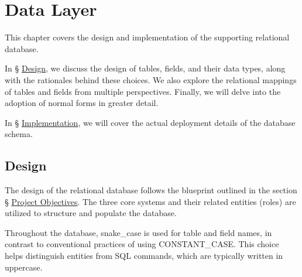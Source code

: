 \documentclass[12pt]{report}
\newcommand{\n}{\par}
\newcommand{\br}{\n\vspace{1 em}\n}
\begin{document}
\chapter{Data Layer} \label{data-layer}
This chapter covers the design and implementation of the supporting relational database.
\br
In \S{} \hyperref[data-layer.design]{Design},
we discuss the design of tables, fields, and their data types, along with the rationales behind these choices.
We also explore the relational mappings of tables and fields from multiple perspectives.
Finally, we will delve into the adoption of normal forms in greater detail.\n
In \S{} \hyperref[data-layer.implementation]{Implementation},
we will cover the actual deployment details of the database schema.



\section{Design} \label{data-layer.design}
The design of the relational database follows the blueprint outlined in the section \S{} \hyperref[overview.project-objectives]{Project Objectives}.
The three core systems and their related entities (roles) are utilized to structure and populate the database.
\br
Throughout the database, snake\_case is used for table and field names, in contrast to conventional practices of using CONSTANT\_CASE.
This choice helps distinguish entities from SQL commands, which are typically written in uppercase.
\end{document}
